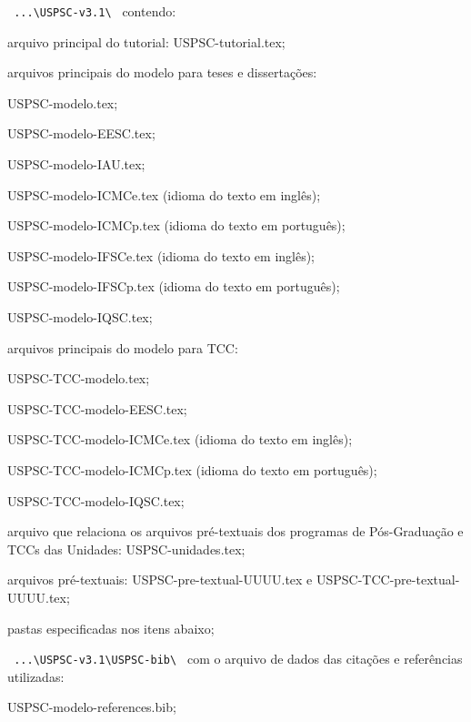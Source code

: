 \begin{alineas}	
	\item \verb+ ...\USPSC-v3.1\ + contendo:	
		\begin{alineas}
			\item arquivo principal do tutorial: USPSC-tutorial.tex;
			\item arquivos principais do modelo para teses e disserta\c{c}\~oes:
				\begin{subalineas}
					\item USPSC-modelo.tex;
					\item USPSC-modelo-EESC.tex;
					\item USPSC-modelo-IAU.tex;
					\item USPSC-modelo-ICMCe.tex (idioma do texto em ingl\^es);
					\item USPSC-modelo-ICMCp.tex (idioma do texto em portugu\^es);
					\item USPSC-modelo-IFSCe.tex (idioma do texto em ingl\^es);
					\item USPSC-modelo-IFSCp.tex (idioma do texto em portugu\^es);
					\item USPSC-modelo-IQSC.tex;
				\end{subalineas}
			\item arquivos principais do modelo para TCC: 
			\begin{subalineas}
				\item USPSC-TCC-modelo.tex;
				\item USPSC-TCC-modelo-EESC.tex;
				\item USPSC-TCC-modelo-ICMCe.tex (idioma do texto em ingl\^es);
				\item USPSC-TCC-modelo-ICMCp.tex (idioma do texto em portugu\^es);
				\item USPSC-TCC-modelo-IQSC.tex;
			\end{subalineas}
			\item arquivo que relaciona os arquivos pr\'e-textuais dos programas de P\'os-Gradua\c{c}\~ao e TCCs das Unidades: USPSC-unidades.tex;
			\item arquivos pr\'e-textuais: USPSC-pre-textual-UUUU.tex e USPSC-TCC-pre-textual-UUUU.tex;
			\item pastas especificadas nos itens abaixo;
	   	\end{alineas}
	   	
	\item \verb+ ...\USPSC-v3.1\USPSC-bib\ + com o arquivo de dados das cita\c{c}\~oes e refer\^encias utilizadas: 
		\begin{alineas}	
			\item USPSC-modelo-references.bib;
		\end{alineas} 
		

\end{alineas}

